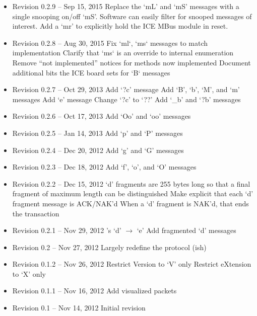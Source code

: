 \documentclass{article}
\begin{document}
\begin{itemize}

\item Revision 0.2.9 -- Sep 15, 2015
\subitem Replace the `mL' and `mS' messages with a single snooping on/off
`mS'. Software can easily filter for snooped messages of interest.
\subitem Add a `mr' to explicitly hold the ICE MBus module in reset.

\item Revision 0.2.8 -- Aug 30, 2015
\subitem Fix `ml`, `ms` messages to match implementation
\subitem Clarify that `ms` is an override to internal enumeration
\subitem Remove ``not implemented'' notices for methods now implemented
\subitem Document additional bits the ICE board sets for `B` messages

\item Revision 0.2.7 -- Oct 29, 2013
\subitem Add `?c' message
\subitem Add `B', `b', `M', and `m' messages
\subitem Add `e' message
\subitem Change `?c' to `??'
\subitem Add `\_b' and `?b' messages

\item Revision 0.2.6 -- Oct 17, 2013
\subitem Add `Oo' and `oo' messages

\item Revision 0.2.5 -- Jan 14, 2013
\subitem Add `p' and `P' messages

\item Revision 0.2.4 -- Dec 20, 2012
\subitem Add `g' and `G' messages

\item Revision 0.2.3 -- Dec 18, 2012
\subitem Add `f', `o', and `O' messages

\item Revision 0.2.2 -- Dec 15, 2012
\subitem `d' fragments are 255 bytes long so that a final fragment of maximum
length can be distinguished
\subitem Make explicit that each `d' fragment message is ACK/NAK'd
\subitem When a `d' fragment is NAK'd, that ends the transaction

\item Revision 0.2.1 -- Nov 29, 2012
's `d' $\rightarrow$ `e'
\subitem Add fragmented `d' messages

\item Revision 0.2 -- Nov 27, 2012
\subitem Largely redefine the protocol (ish)

\item Revision 0.1.2 -- Nov 26, 2012
\subitem Restrict Version to `V' only
\subitem Restrict eXtension to `X' only

\item Revision 0.1.1 -- Nov 16, 2012
\subitem Add visualized packets

\item Revision 0.1 -- Nov 14, 2012
\subitem Initial revision

\end{itemize}
\end{document}
